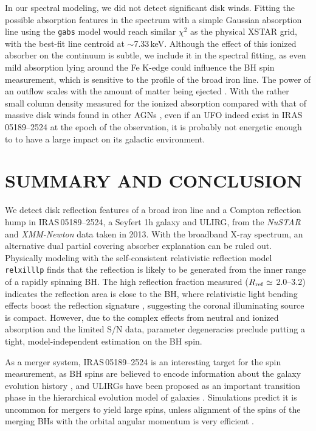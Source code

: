 \documentclass[]{emulateapj}
\def \nustar {{\em NuSTAR }}
\def \xmm {{\em XMM-Newton }}
\def \iras {{IRAS\,05189--2524 }}
\begin{document}
In our spectral modeling, we did not detect significant disk winds. Fitting the possible absorption features in the spectrum with a simple Gaussian absorption line using the {\tt gabs} model would reach similar $\chi^{2}$ as the physical {\small XSTAR} grid, with the best-fit line centroid at $\sim$7.33\,keV.  Although the effect of this ionized absorber on the continuum is subtle, we include it in the spectral fitting, as even mild absorption lying around the Fe K-edge could influence the BH spin measurement, which is sensitive to the profile of the broad iron line. The power of an outflow scales with the amount of matter being ejected \citep{kin15}. With the rather small column density measured for the ionized absorption compared with that of massive disk winds found in other AGNs \citep[e.g., IRAS\,11119+3257,][]{tom15}, even if an UFO indeed exist in {IRAS\,05189--2524} at the epoch of the observation, it is probably not energetic enough to to have a large impact on its galactic environment. 

\section{SUMMARY AND CONCLUSION}
\label{sec:con}
We detect disk reflection features of a broad iron line and a Compton reflection hump in {IRAS\,05189--2524}, a Seyfert 1h galaxy and ULIRG, from the \nustar and \xmm data taken in 2013. With the broadband X-ray spectrum, an alternative dual partial covering absorber explanation can be ruled out. Physically modeling with the self-consistent relativistic reflection model {\tt relxilllp} finds that the reflection is likely to be generated from the inner range of a rapidly spinning BH. The high reflection fraction measured ($R_{\rm ref} \simeq$ 2.0--3.2) indicates the reflection area is close to the BH, where relativistic light bending effects boost the reflection signature \citep{min04}, suggesting the coronal illuminating source is compact. However, due to the complex effects from neutral and ionized absorption and the limited S/N data, parameter degeneracies preclude putting a tight, model-independent estimation on the BH spin. 

As a merger system, \iras is an interesting target for the spin measurement, as BH spins are believed to encode information about the galaxy evolution history \citep{ber08}, and ULIRGs have been proposed as an important transition phase in the hierarchical evolution model of galaxies \citep{hop06, san88}. Simulations predict it is uncommon for mergers to yield large spins, unless alignment of the spins of the merging BHs with the orbital angular momentum is very efficient \citep{ber08}. 
\end{document}
